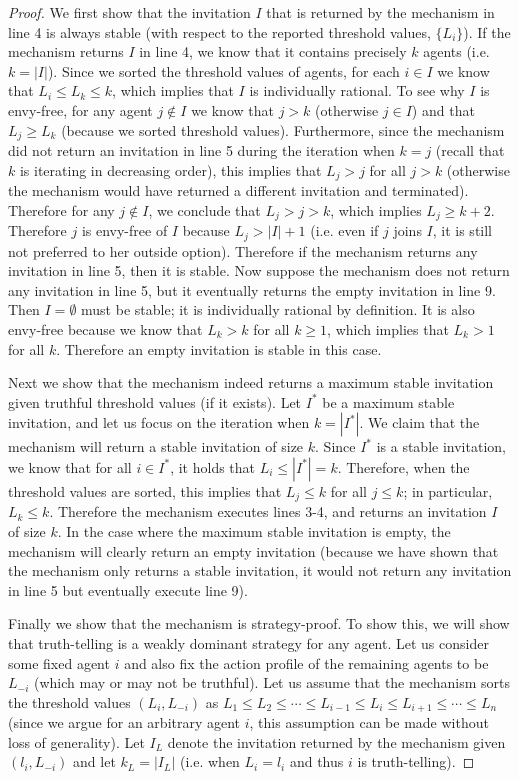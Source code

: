 \begin{proof}
We first show that the invitation $I$ that is returned by the mechanism in line 4 is always stable (with respect to the reported threshold values, $\{L_i\}$). If the mechanism returns $I$ in line 4, we know that it contains precisely $k$ agents (i.e. $k = |I|$). Since we sorted the threshold values of agents, for each $i \in I$ we know that $L_i \leq L_k \leq k$, which implies that $I$ is individually rational. To see why $I$ is envy-free, for any agent $j\not\in I$ we know that $j > k$ (otherwise $j\in I$) and that $L_j \geq L_k$ (because we sorted threshold values). Furthermore, since the mechanism did not return an invitation in line 5 during the iteration when $k = j$ (recall that $k$ is iterating in decreasing order), this implies that $L_j > j$ for all $j > k$ (otherwise the mechanism would have returned a different invitation and terminated). Therefore for any $j\not\in I$, we conclude that $L_j > j > k$, which implies $L_j \geq k+2$. Therefore $j$ is envy-free of $I$ because $L_j > |I| + 1$ (i.e. even if $j$ joins $I$, it is still not preferred to her outside option). Therefore if the mechanism returns any invitation in line 5, then it is stable. Now suppose the mechanism does not return any invitation in line 5, but it eventually returns the empty invitation in line 9. Then $I = \emptyset$ must be stable; it is individually rational by definition. It is also envy-free because we know that $L_k > k$ for all $k \geq 1$, which implies that $L_k > 1$ for all $k$. Therefore an empty invitation is stable in this case.

	Next we show that the mechanism indeed returns a maximum stable invitation given truthful threshold values (if it exists). Let $I^*$ be a maximum stable invitation, and let us focus on the iteration when $k = |I^*|$. We claim that the mechanism will return a stable invitation of size $k$.  Since $I^*$ is a stable invitation, we know that for all $i\in I^*$, it holds that $L_i \leq |I^*| = k$. Therefore, when the threshold values are sorted, this implies that $L_j \leq k$ for all $j\leq k$; in particular, $L_k \leq k$. Therefore the mechanism executes lines 3-4, and returns an invitation $I$ of size $k$.  In the case where the maximum stable invitation is empty, the mechanism will clearly return an empty invitation (because we have shown that the mechanism only returns a stable invitation, it would not return any invitation in line 5 but eventually execute line 9). 

	Finally we show that the mechanism is strategy-proof. To show this, we will show that truth-telling is a weakly dominant strategy for any agent. 
	Let us consider some fixed agent $i$ and also fix the action profile of the remaining agents to be $L_{-i}$ (which may or may not be truthful).
	Let us assume that the mechanism sorts the threshold values $(L_i, L_{-i})$ as $L_1 \leq L_2 \leq \cdots \leq L_{i-1} \leq L_i \leq L_{i+1} \leq \cdots \leq L_n$ (since we argue for an arbitrary agent $i$, this assumption can be made without loss of generality).
	Let $I_L$ denote the invitation returned by the mechanism given $(l_i, L_{-i})$ and let $k_L = |I_L|$ (i.e. when $L_i = l_i$ and thus $i$ is truth-telling). 


\end{proof}

